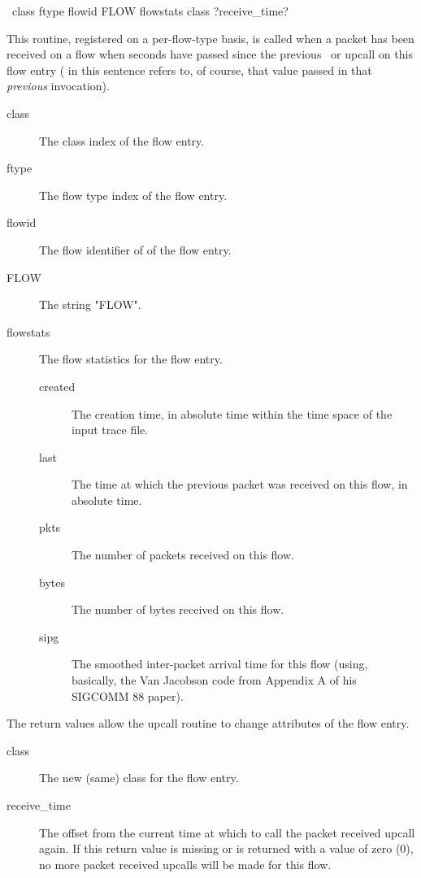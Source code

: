\documentclass{article}
\begin{document}
\manend


\SYNOPSIS \cmdname\ class ftype flowid FLOW flowstats
\RETURNVALUES class ?receive\_time?

\DESCRIPTION

This routine, registered on a per-flow-type basis, is called when a
packet has been received on a flow when  seconds
have passed since the previous \cmdname\ or
 upcall on this flow entry
( in this sentence refers to, of course, that
value passed in that \emph{previous} invocation).

\begin{description}
\item[class] The class index of the flow entry.
\item[ftype] The flow type index of the flow entry.
\item[flowid] The flow identifier of of the flow entry.
\item[FLOW] The string "FLOW".
\item[flowstats] The flow statistics for the flow entry.
\begin{description}
\item[created] The creation time, in absolute time within the time
space of the input trace file.
\item[last] The time at which the previous packet was received on this
flow, in absolute time.
\item[pkts] The number of packets received on this flow.
\item[bytes] The number of bytes received on this flow.
\item[sipg] The smoothed inter-packet arrival time for this flow
(using, basically,
the Van Jacobson code from Appendix A of his SIGCOMM 88 paper).
\end{description}
\end{description}

The return values allow the upcall routine to change attributes of the
flow entry.

\begin{description}
\item[class]  The new (same) class for the flow entry.
\item[receive\_time] The offset from the current time at which to call
the packet received upcall again.  If this return value is missing or
is returned with a value of zero (0), no more packet received upcalls
will be made for this flow.
\end{description}

\manend


\manend
\end{document}
